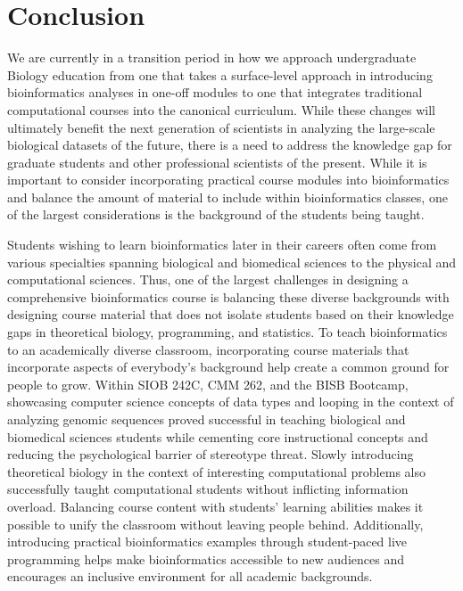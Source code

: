 \section{Conclusion}

We are currently in a transition period in how we approach undergraduate Biology education from one that takes a surface-level approach in introducing bioinformatics analyses in one-off modules to one that integrates traditional computational courses into the canonical curriculum. While these changes will ultimately benefit the next generation of scientists in analyzing the large-scale biological datasets of the future, there is a need to address the knowledge gap for graduate students and other professional scientists of the present. While it is important to consider incorporating practical course modules into bioinformatics and balance the amount of material to include within bioinformatics classes, one of the largest considerations is the background of the students being taught.

Students wishing to learn bioinformatics later in their careers often come from various specialties spanning biological and biomedical sciences to the physical and computational sciences. Thus, one of the largest challenges in designing a comprehensive bioinformatics course is balancing these diverse backgrounds with designing course material that does not isolate students based on their knowledge gaps in theoretical biology, programming, and statistics. To teach bioinformatics to an academically diverse classroom, incorporating course materials that incorporate aspects of everybody’s background help create a common ground for people to grow. Within SIOB 242C, CMM 262, and the BISB Bootcamp, showcasing computer science concepts of data types and looping in the context of analyzing genomic sequences proved successful in teaching biological and biomedical sciences students while cementing core instructional concepts and reducing the psychological barrier of stereotype threat. Slowly introducing theoretical biology in the context of interesting computational problems also successfully taught computational students without inflicting information overload. Balancing course content with students’ learning abilities makes it possible to unify the classroom without leaving people behind. Additionally, introducing practical bioinformatics examples through student-paced live programming helps make bioinformatics accessible to new audiences and encourages an inclusive environment for all academic backgrounds.

